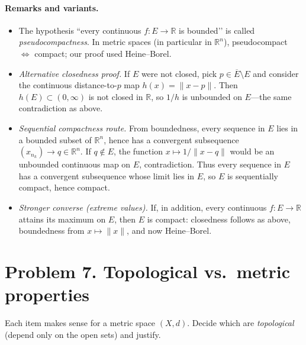 \documentclass[12pt,a4paper]{article}
\theoremstyle{plain}
\theoremstyle{definition}
\theoremstyle{remark}
\theoremstyle{remark}
\begin{document}
\paragraph{Remarks and variants.}
\begin{itemize}
	\item The hypothesis “every continuous $f:E\to\mathbb R$ is bounded’’ is called
	\emph{pseudocompactness}. In metric spaces (in particular in $\mathbb R^n$),
	pseudocompact $\Longleftrightarrow$ compact; our proof used Heine--Borel.
	
	\item \emph{Alternative closedness proof.}
	If $E$ were not closed, pick $p\in\overline E\setminus E$ and consider the continuous
	distance-to-$p$ map $h(x)=\|x-p\|$. Then $h(E)\subset(0,\infty)$ is not closed in $\mathbb R$,
	so $1/h$ is unbounded on $E$—the same contradiction as above.
	
	\item \emph{Sequential compactness route.}
	From boundedness, every sequence in $E$ lies in a bounded subset of $\mathbb R^n$,
	hence has a convergent subsequence $(x_{n_k})\to q\in\mathbb R^n$.
	If $q\notin E$, the function $x\mapsto 1/\|x-q\|$ would be an unbounded continuous map on $E$,
	contradiction. Thus every sequence in $E$ has a convergent subsequence whose limit lies in $E$,
	so $E$ is sequentially compact, hence compact.
	
	\item \emph{Stronger converse (extreme values).}
	If, in addition, every continuous $f:E\to\mathbb R$ attains its maximum on $E$, then $E$ is
	compact: closedness follows as above, boundedness from $x\mapsto\|x\|$, and now Heine--Borel.
\end{itemize}

\section*{Problem 7. Topological vs.\ metric properties}

Each item makes sense for a metric space $(X,d)$. Decide which are \emph{topological}
(depend only on the open sets) and justify.
\end{document}
